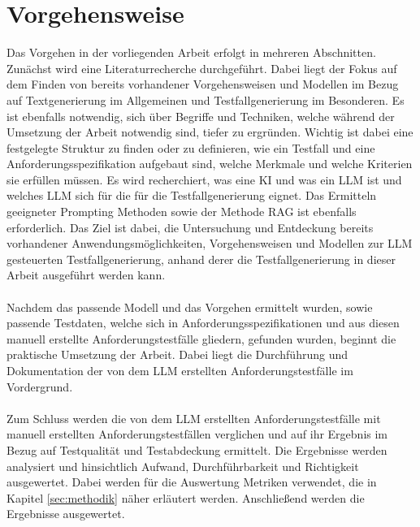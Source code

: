 \documentclass[12pt,toc=bib,toc=listof]{scrreprt}
\begin{document}
\section{Vorgehensweise} %
\label{sec:vorgehensweise}
Das Vorgehen in der vorliegenden Arbeit erfolgt in mehreren Abschnitten. Zunächst wird eine Literaturrecherche durchgeführt. Dabei liegt der Fokus auf dem Finden von bereits vorhandener Vorgehensweisen und Modellen im Bezug auf Textgenerierung im Allgemeinen und Testfallgenerierung im Besonderen. Es ist ebenfalls notwendig, sich über Begriffe und Techniken, welche während der Umsetzung der Arbeit notwendig sind, tiefer zu ergründen. Wichtig ist dabei eine festgelegte Struktur zu finden oder zu definieren, wie ein Testfall und eine Anforderungsspezifikation aufgebaut sind, welche Merkmale und welche Kriterien sie erfüllen müssen. Es wird recherchiert, was eine KI und was ein LLM ist und welches LLM sich für die für die Testfallgenerierung eignet. Das Ermitteln geeigneter Prompting Methoden sowie der Methode RAG ist ebenfalls erforderlich. Das Ziel ist dabei, die Untersuchung und Entdeckung bereits vorhandener Anwendungsmöglichkeiten, Vorgehensweisen und Modellen zur LLM gesteuerten Testfallgenerierung, anhand derer die Testfallgenerierung in dieser Arbeit ausgeführt werden kann.\\
\\
Nachdem das passende Modell und das Vorgehen ermittelt wurden, sowie passende Testdaten, welche sich in Anforderungsspezifikationen und aus diesen manuell erstellte Anforderungstestfälle gliedern, gefunden wurden, beginnt die praktische Umsetzung der Arbeit. Dabei liegt die Durchführung und Dokumentation der von dem LLM erstellten Anforderungstestfälle im Vordergrund.\\
\\
Zum Schluss werden die von dem LLM erstellten Anforderungstestfälle mit manuell erstellten Anforderungstestfällen verglichen und auf ihr Ergebnis im Bezug auf Testqualität und Testabdeckung ermittelt. Die Ergebnisse werden analysiert und hinsichtlich Aufwand, Durchführbarkeit und Richtigkeit ausgewertet. Dabei werden für die Auswertung Metriken verwendet, die in Kapitel \ref{sec:methodik} näher erläutert werden. Anschließend werden die Ergebnisse ausgewertet.
\end{document}

